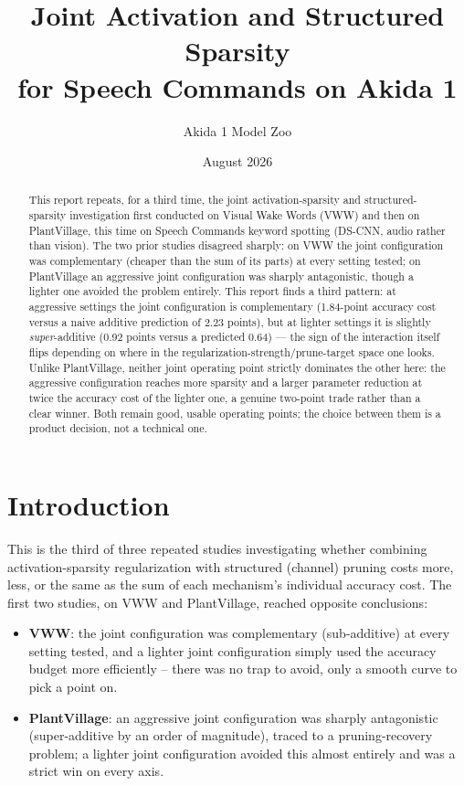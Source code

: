 \documentclass[11pt]{article}
\title{Joint Activation and Structured Sparsity\\ for Speech Commands on Akida 1}
\author{Akida 1 Model Zoo}
\date{August 2026}
\begin{document}
\maketitle

\begin{abstract}
This report repeats, for a third time, the joint activation-sparsity and structured-sparsity investigation first conducted on Visual Wake Words (VWW) and then on PlantVillage, this time on Speech Commands keyword spotting (DS-CNN, audio rather than vision). The two prior studies disagreed sharply: on VWW the joint configuration was complementary (cheaper than the sum of its parts) at every setting tested; on PlantVillage an aggressive joint configuration was sharply antagonistic, though a lighter one avoided the problem entirely. This report finds a third pattern: at aggressive settings the joint configuration is complementary (1.84-point accuracy cost versus a naive additive prediction of 2.23 points), but at lighter settings it is slightly \emph{super}-additive (0.92 points versus a predicted 0.64) --- the sign of the interaction itself flips depending on where in the regularization-strength/prune-target space one looks. Unlike PlantVillage, neither joint operating point strictly dominates the other here: the aggressive configuration reaches more sparsity and a larger parameter reduction at twice the accuracy cost of the lighter one, a genuine two-point trade rather than a clear winner. Both remain good, usable operating points; the choice between them is a product decision, not a technical one.
\end{abstract}

\tableofcontents

\section{Introduction}

This is the third of three repeated studies investigating whether combining activation-sparsity regularization with structured (channel) pruning costs more, less, or the same as the sum of each mechanism's individual accuracy cost. The first two studies, on VWW and PlantVillage, reached opposite conclusions:

\begin{itemize}
    \item \textbf{VWW}: the joint configuration was complementary (sub-additive) at every setting tested, and a lighter joint configuration simply used the accuracy budget more efficiently -- there was no trap to avoid, only a smooth curve to pick a point on.
    \item \textbf{PlantVillage}: an aggressive joint configuration was sharply antagonistic (super-additive by an order of magnitude), traced to a pruning-recovery problem; a lighter joint configuration avoided this almost entirely and was a strict win on every axis.
\end{itemize}
\end{document}
